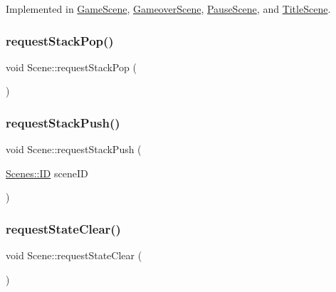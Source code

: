 Implemented in \hyperlink{class_game_scene_aa494372b1f451f3c3a268558fddb30f2}{Game\+Scene}, \hyperlink{class_gameover_scene_ac951bc51d29e2d14807e3da2e885ccc8}{Gameover\+Scene}, \hyperlink{class_pause_scene_adeb06e37e0a2afa297ddbe795c3cbe94}{Pause\+Scene}, and \hyperlink{class_title_scene_a1f019a83309ce967883b4b4d76b816af}{Title\+Scene}.

\mbox{\label{class_scene_ad2f2093a8adc09c11e89cda6f94a3dd1}} 
\subsubsection{\texorpdfstring{request\+Stack\+Pop()}{requestStackPop()}}
{\footnotesize\ttfamily void Scene\+::request\+Stack\+Pop (\begin{DoxyParamCaption}{ }\end{DoxyParamCaption})\hspace{0.3cm}{\ttfamily [protected]}}

\mbox{\label{class_scene_a38d36125a421eab649188edb740d1c36}} 
\subsubsection{\texorpdfstring{request\+Stack\+Push()}{requestStackPush()}}
{\footnotesize\ttfamily void Scene\+::request\+Stack\+Push (\begin{DoxyParamCaption}\item[{\hyperlink{namespace_scenes_a0ad7ab6856b1d77d498e3a251f6bb275}{Scenes\+::\+ID}}]{scene\+ID }\end{DoxyParamCaption})\hspace{0.3cm}{\ttfamily [protected]}}

\mbox{\label{class_scene_a0cc91a92f27ba281b52c58168b7a000a}} 
\subsubsection{\texorpdfstring{request\+State\+Clear()}{requestStateClear()}}
{\footnotesize\ttfamily void Scene\+::request\+State\+Clear (\begin{DoxyParamCaption}{ }\end{DoxyParamCaption})\hspace{0.3cm}{\ttfamily [protected]}}

